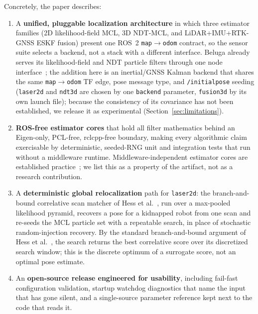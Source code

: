 Concretely, the paper describes:
\begin{enumerate}
  \item A \textbf{unified, pluggable localization architecture} in which
    three estimator families (2D likelihood-field MCL, 3D NDT-MCL, and
    LiDAR+IMU+RTK-GNSS ESKF fusion) present one ROS~2
    \texttt{map}$\to$\texttt{odom} contract, so the sensor suite selects
    a backend, not a stack with a different interface. Beluga already
    serves its likelihood-field and NDT particle filters through one
    node interface~\cite{puga2024beluga,ekumen2022belugarepo}; the
    addition here is an inertial/GNSS Kalman backend that shares the
    same \texttt{map}$\to$\texttt{odom} TF edge, pose message type, and
    \texttt{/initialpose} seeding (\texttt{laser2d} and \texttt{ndt3d}
    are chosen by one \texttt{backend} parameter, \texttt{fusion3d} by
    its own launch file); because the consistency of its covariance has
    not been established, we release it as experimental
    (Section~\ref{sec:limitations}).
  \item \textbf{ROS-free estimator cores} that hold all filter
    mathematics behind an Eigen-only, PCL-free, rclcpp-free boundary,
    making every algorithmic claim exercisable by deterministic,
    seeded-RNG unit and integration tests that run without a middleware
    runtime. Middleware-independent estimator cores are established
    practice~\cite{puga2024beluga,pedrosa2019lama}; we list this as a
    property of the artifact, not as a research contribution.
  \item A \textbf{deterministic global relocalization} path for
    \texttt{laser2d}: the branch-and-bound correlative scan matcher of
    Hess et al.~\cite{hess2016realtime}, run over a max-pooled
    likelihood pyramid, recovers a pose for a kidnapped robot from one
    scan and re-seeds the MCL particle set with a repeatable search, in
    place of stochastic random-injection recovery. By the standard
    branch-and-bound argument of Hess et al.~\cite{hess2016realtime}, the
    search returns the best correlative score over its discretized
    search window; this is the discrete optimum of a surrogate score,
    not an optimal pose estimate.
  \item An \textbf{open-source release engineered for usability},
    including fail-fast configuration validation, startup watchdog
    diagnostics that name the input that has gone silent, and a
    single-source parameter reference kept next to the code that reads
    it.
\end{enumerate}

